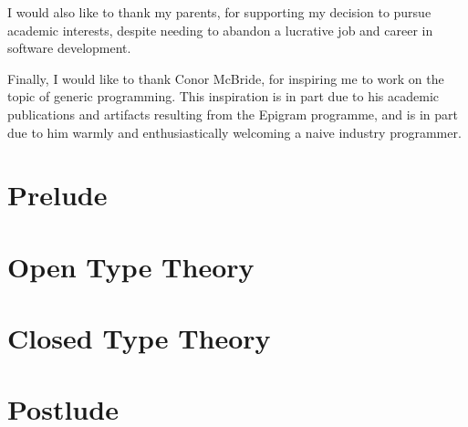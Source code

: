 \documentclass[12pt]{report}
\theoremstyle{definition}
\theoremstyle{remark}
\numberwithin{definition}{section}
\numberwithin{equation}{section}
\numberwithin{proposition}{section}
\numberwithin{conjecture}{section}
\numberwithin{theorem}{section}
\numberwithin{lemma}{section}
\numberwithin{corollary}{section}
\numberwithin{example}{section}
\numberwithin{remark}{section}
\begin{document}
I would also like to thank my parents, for supporting my decision to
pursue academic interests, despite needing to abandon a lucrative job
and career in software development.

Finally, I would like to thank Conor McBride, for inspiring me to work
on the topic of generic programming. This inspiration is in part due
to his academic publications and artifacts resulting from the
Epigram programme, and is in part due to him warmly and enthusiastically
welcoming a naive industry programmer.

\newpage

\tablespagefalse
\figurespagefalse
\afterpreface
\body

\part{Prelude}\label{part:prelude}












\part{Open Type Theory}\label{part:open}






\part{Closed Type Theory}\label{part:closed}









\part{Postlude}\label{part:postlude}
\end{document}

